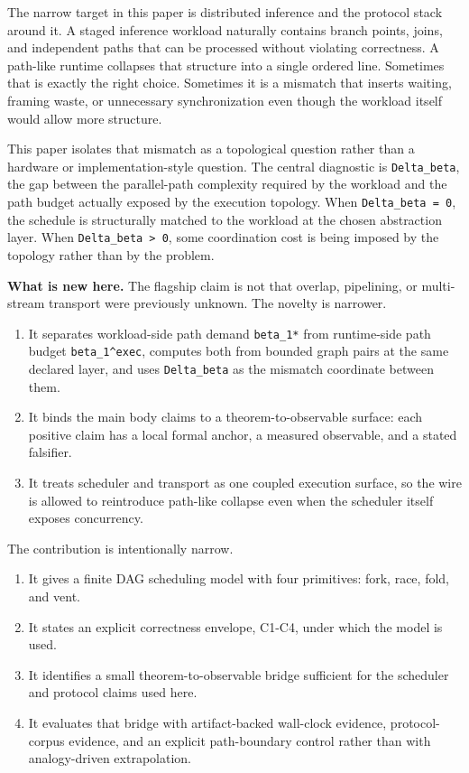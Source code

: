 \documentclass[
  11pt,
]{article}
\providecommand{\tightlist}{%
  \setlength{\itemsep}{0pt}\setlength{\parskip}{0pt}}
\begin{document}
The narrow target in this paper is distributed inference and the
protocol stack around it. A staged inference workload naturally contains
branch points, joins, and independent paths that can be processed
without violating correctness. A path-like runtime collapses that
structure into a single ordered line. Sometimes that is exactly the
right choice. Sometimes it is a mismatch that inserts waiting, framing
waste, or unnecessary synchronization even though the workload itself
would allow more structure.

This paper isolates that mismatch as a topological question rather than
a hardware or implementation-style question. The central diagnostic is
\texttt{Delta\_beta}, the gap between the parallel-path complexity
required by the workload and the path budget actually exposed by the
execution topology. When \texttt{Delta\_beta\ =\ 0}, the schedule is
structurally matched to the workload at the chosen abstraction layer.
When \texttt{Delta\_beta\ \textgreater{}\ 0}, some coordination cost is
being imposed by the topology rather than by the problem.

\textbf{What is new here.} The flagship claim is not that overlap,
pipelining, or multi-stream transport were previously unknown. The
novelty is narrower.

\begin{enumerate}
\def\labelenumi{\arabic{enumi}.}
\tightlist
\item
  It separates workload-side path demand \texttt{beta\_1*} from
  runtime-side path budget \texttt{beta\_1\^{}exec}, computes both from
  bounded graph pairs at the same declared layer, and uses
  \texttt{Delta\_beta} as the mismatch coordinate between them.
\item
  It binds the main body claims to a theorem-to-observable surface: each
  positive claim has a local formal anchor, a measured observable, and a
  stated falsifier.
\item
  It treats scheduler and transport as one coupled execution surface, so
  the wire is allowed to reintroduce path-like collapse even when the
  scheduler itself exposes concurrency.
\end{enumerate}

The contribution is intentionally narrow.

\begin{enumerate}
\def\labelenumi{\arabic{enumi}.}
\tightlist
\item
  It gives a finite DAG scheduling model with four primitives: fork,
  race, fold, and vent.
\item
  It states an explicit correctness envelope, C1-C4, under which the
  model is used.
\item
  It identifies a small theorem-to-observable bridge sufficient for the
  scheduler and protocol claims used here.
\item
  It evaluates that bridge with artifact-backed wall-clock evidence,
  protocol-corpus evidence, and an explicit path-boundary control rather
  than with analogy-driven extrapolation.
\end{enumerate}
\end{document}
